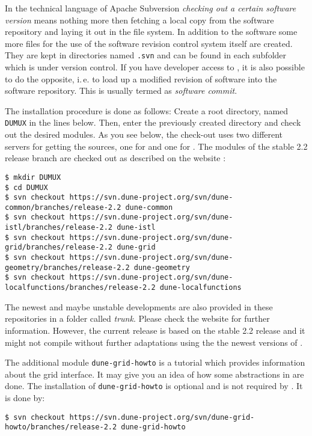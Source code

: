 In the technical language of Apache Subversion \emph{checking out a certain software version} means nothing more then fetching 
a local copy from the software repository and laying it out in the file system.  In addition to the software some more files for the use of the software revision control system itself are created. They are kept in directories named \texttt{.svn} and can be found in each subfolder which is under version control.
If you have developer access to \Dumux, it is also possible to do the opposite, i.\,e. to load up a modified revision of software into the software repository. This is usually termed as \emph{software commit}.

The installation procedure is done as follows:
Create a  {\Dune} root directory, named \texttt{DUMUX} in the lines below.
Then, enter the previously created directory and check out the desired modules. 
As you see below, the check-out uses two different servers for getting the sources, one for \Dune and one for {\Dumux}.
The \Dune modules of the stable 2.2 release branch are checked out as described on the \Dune website \cite{DUNE-DOWNLOAD-SVN}:

\begin{lstlisting}[style=Bash]
$ mkdir DUMUX
$ cd DUMUX
$ svn checkout https://svn.dune-project.org/svn/dune-common/branches/release-2.2 dune-common
$ svn checkout https://svn.dune-project.org/svn/dune-istl/branches/release-2.2 dune-istl
$ svn checkout https://svn.dune-project.org/svn/dune-grid/branches/release-2.2 dune-grid
$ svn checkout https://svn.dune-project.org/svn/dune-geometry/branches/release-2.2 dune-geometry
$ svn checkout https://svn.dune-project.org/svn/dune-localfunctions/branches/release-2.2 dune-localfunctions
\end{lstlisting}

The newest and maybe unstable developments are also provided in these repositories in a folder called \emph{trunk}. Please check the \Dune website \cite{DUNE-DOWNLOAD-SVN} for further information. However, the current \Dumux release is based on the stable 2.2 release and it might not compile without further adaptations using the the newest versions of \Dune.

The additional module \texttt{dune-grid-howto} is a tutorial which provides information about the \Dune grid interface.
It may give you an idea of how some abstractions in \Dune are done.
The installation of \texttt{dune-grid-howto} is optional and is not required by \Dumux. It is done by: 

\begin{lstlisting}[style=Bash]
$ svn checkout https://svn.dune-project.org/svn/dune-grid-howto/branches/release-2.2 dune-grid-howto
\end{lstlisting}

